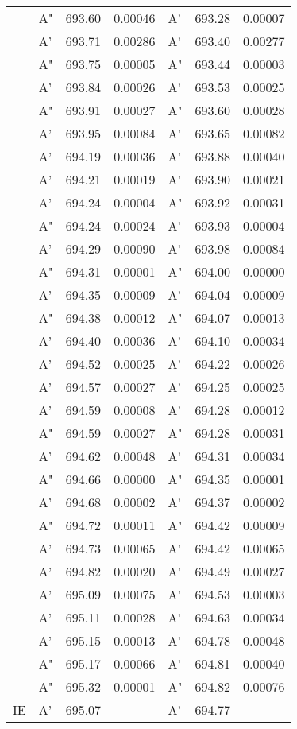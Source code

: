 \documentclass[journal=jctcce,manuscript=article]{achemso}
\begin{document}
\begin{table}[H]
\begin{tabular}{l|lcc|lcc}
& A" & 693.60 & 0.00046	& A' & 693.28 & 0.00007 \\
& A' & 693.71 & 0.00286	& A' & 693.40 & 0.00277 \\
& A" & 693.75 & 0.00005	& A" & 693.44 & 0.00003 \\
& A' & 693.84 & 0.00026	& A' & 693.53 & 0.00025 \\
& A" & 693.91 & 0.00027	& A" & 693.60 & 0.00028 \\
& A' & 693.95 & 0.00084	& A' & 693.65 & 0.00082 \\
& A' & 694.19 & 0.00036	& A' & 693.88 & 0.00040 \\
& A' & 694.21 & 0.00019	& A' & 693.90 & 0.00021 \\
& A' & 694.24 & 0.00004	& A" & 693.92 & 0.00031 \\
& A" & 694.24 & 0.00024	& A' & 693.93 & 0.00004 \\
& A' & 694.29 & 0.00090	& A' & 693.98 & 0.00084 \\
& A" & 694.31 & 0.00001	& A" & 694.00 & 0.00000 \\
& A' & 694.35 & 0.00009	& A' & 694.04 & 0.00009 \\
& A" & 694.38 & 0.00012	& A" & 694.07 & 0.00013 \\
& A' & 694.40 & 0.00036	& A' & 694.10 & 0.00034 \\
& A' & 694.52 & 0.00025	& A' & 694.22 & 0.00026 \\
& A' & 694.57 & 0.00027	& A' & 694.25 & 0.00025 \\
& A' & 694.59 & 0.00008	& A' & 694.28 & 0.00012 \\
& A" & 694.59 & 0.00027	& A" & 694.28 & 0.00031 \\
& A' & 694.62 & 0.00048	& A' & 694.31 & 0.00034 \\
& A" & 694.66 & 0.00000	& A" & 694.35 & 0.00001 \\
& A' & 694.68 & 0.00002	& A' & 694.37 & 0.00002 \\
& A" & 694.72 & 0.00011	& A" & 694.42 & 0.00009 \\
& A' & 694.73 & 0.00065	& A' & 694.42 & 0.00065 \\
& A' & 694.82 & 0.00020	& A' & 694.49 & 0.00027 \\
& A' & 695.09 & 0.00075	& A' & 694.53 & 0.00003 \\
& A' & 695.11 & 0.00028	& A' & 694.63 & 0.00034 \\
& A' & 695.15 & 0.00013	& A' & 694.78 & 0.00048 \\
& A" & 695.17 & 0.00066	& A' & 694.81 & 0.00040 \\
& A" & 695.32 & 0.00001	& A" & 694.82 & 0.00076 \\
\hline
IE & A' & 695.07& 
   & A' & 694.77 &  \\
   \hline
  \end{tabular}
\end{table}
\end{document}
